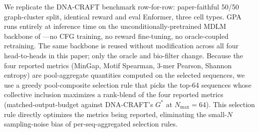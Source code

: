 \documentclass{article}
\theoremstyle{definition}
\theoremstyle{remark}
\newcommand{\gpa}{\textsc{GPA}\xspace}
\newcommand{\dnacraft}{\textsc{DNA-CRAFT}\xspace}
\begin{document}
We replicate the \dnacraft{} \citep{dnacraft2026} benchmark row-for-row: paper-faithful 50/50 graph-cluster split, identical reward and eval Enformer, three cell types. \gpa{} runs entirely at inference time on the unconditionally-pretrained MDLM backbone of \citet{sahoo2024mdlm}---no CFG training, no reward fine-tuning, no oracle-coupled retraining. The same backbone is reused without modification across all four head-to-heads in this paper; only the oracle and bio-filter change. Because the four reported metrics (MinGap, Motif Spearman, 3-mer Pearson, Shannon entropy) are pool-aggregate quantities computed on the selected sequences, we use a greedy pool-composite selection rule that picks the top-64 sequences whose collective inclusion maximizes a rank-blend of the four reported metrics (matched-output-budget against \dnacraft{}'s $G^\ast$ at $N_{\max}\!=\!64$). This selection rule directly optimizes the metrics being reported, eliminating the small-$N$ sampling-noise bias of per-seq-aggregated selection rules.
\end{document}
